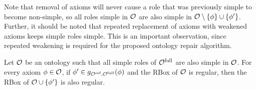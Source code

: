 \documentclass[
]{ceurart}
\begin{document}
Note that removal of axioms will never cause a role that was previously simple to become non-simple, so all roles simple in $\mathcal{O}$ are also simple in $\mathcal{O} \setminus \{ \phi \} \cup\{ \phi' \}$. Further, it should be noted that repeated replacement of axioms with weakened axioms keeps simple roles simple. This is an important observation, since repeated weakening is required for the proposed ontology repair algorithm.

\begin{lemma} \label{lem:regularity}
  Let $\mathcal{O}$ be an ontology such that all simple roles of ${\mathcal{O}^\textnormal{full}}$ are also simple in $\mathcal{O}$. For every axiom $\phi \in \mathcal{O}$, if $\phi' \in g_{{\mathcal{O}^\textnormal{ref}},{\mathcal{O}^\textnormal{full}}}(\phi)$ and the RBox of $\mathcal{O}$ is regular, then the RBox of $\mathcal{O} \cup \{ \phi' \}$ is also regular.
\end{lemma}

\end{document}
